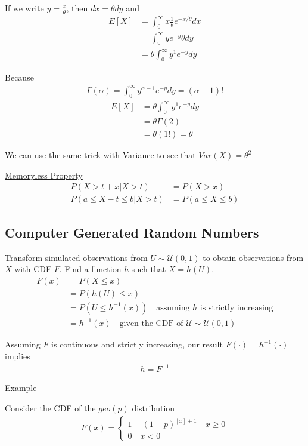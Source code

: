 \documentclass{article}
\begin{document}
If we write $y = \frac{x}{\theta}$, then $dx = \theta dy$ and
\begin{align*}
    E[X] &= \int_0^{\infty}x\frac{1}{\theta}e^{-x/\theta}dx \\
    &= \int_0^{\infty}ye^{-y}\theta dy \\
    &= \theta \int_0^{\infty}y^1e^{-y}dy
\end{align*}

Because
\begin{align*}
    \Gamma(\alpha) = \int_0^{\infty}y^{\alpha-1}e^{-y}dy = (\alpha -1)!
\end{align*}
\begin{align*}
    E[X] &= \theta \int_0^{\infty}y^1e^{-y}dy \\
    &= \theta \Gamma(2) \\
    &= \theta (1!) = \theta
\end{align*}

We can use the same trick with Variance to see that $Var(X) = \theta^2$

\underline{Memoryless Property}
\begin{align*}
    P(X > t + x | X > t) &= P(X > x)\\
    P(a \le X - t \le b | X > t) &= P(a \le X \le b)
\end{align*}

\subsection{Computer Generated Random Numbers}

Transform simulated observations from $U \sim \mathcal{U}(0,1)$ to obtain observations from $X$ with CDF $F$. Find a function $h$ such that $X = h(U)$.
\begin{align*}
    F(x) &= P(X \le x) \\
    &= P(h(U) \le x) \\
    &= P(U \le h^{-1}(x)) \quad \text{assuming } h \text{ is strictly increasing} \\
    &= h^{-1}(x) \quad \text{given the CDF of } \mathcal{U} \sim \mathcal{U}(0,1)
\end{align*}

Assuming $F$ is continuous and strictly increasing, our result $F(\cdot) = h^{-1}(\cdot)$ implies
\begin{align*}
    h = F^{-1}
\end{align*}

\underline{Example}

Consider the CDF of the $geo(p)$ distribution
\begin{align*}
    F(x) = \begin{cases}
        1-(1-p)^{[x]+1} \quad x \ge 0 \\
        0 \quad x < 0
    \end{cases}
\end{align*}
\end{document}
